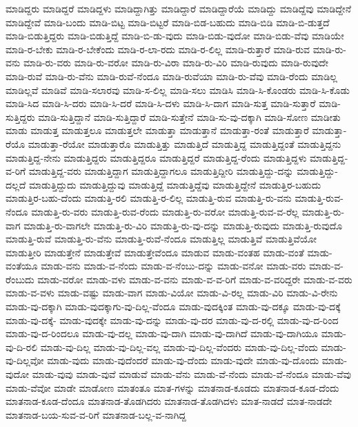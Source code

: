 {ಮಾಡಿದ್ದರು
ಮಾಡಿದ್ದರೆ
ಮಾಡಿದ್ದಳು
ಮಾಡಿದ್ದಾಗಿತ್ತು
ಮಾಡಿದ್ದಾರೆ
ಮಾಡಿದ್ದಾರೆಯೆ
ಮಾಡಿದ್ದು
ಮಾಡಿದ್ದೆವು
ಮಾಡಿದ್ದೇನೆ
ಮಾಡಿದ್ದೇವೆ
ಮಾಡಿ-ಬಂದು
ಮಾಡಿ-ಬಿಟ್ಟ
ಮಾಡಿ-ಬಿಟ್ಟರೆ
ಮಾಡಿ-ಬಿಡ-ಬಹುದು
ಮಾಡಿ-ಬಿಡಿ
ಮಾಡಿ-ಬಿ-ಡುತ್ತದೆ
ಮಾಡಿ-ಬಿಡುತ್ತಿದ್ದರು
ಮಾಡಿ-ಬಿಡುತ್ತಿದ್ದೆ
ಮಾಡಿ-ಬಿ-ಡು-ವುದು
ಮಾಡಿ-ಬಿಡು-ವುದೋ
ಮಾಡಿ-ಬಿಡು-ವೆವು
ಮಾಡಿಯೇ
ಮಾಡಿ-ರ-ಬೇಕು
ಮಾಡಿ-ರ-ಬೇಕೆಂದು
ಮಾಡಿ-ರ-ಲಾ-ರದು
ಮಾಡಿ-ರ-ಲಿಲ್ಲ
ಮಾಡಿ-ರುತ್ತಾರೆ
ಮಾಡಿ-ರುವ
ಮಾಡಿ-ರು-ವನು
ಮಾಡಿ-ರು-ವರು
ಮಾಡಿ-ರು-ವರೋ
ಮಾಡಿ-ರು-ವಿರಾ
ಮಾಡಿ-ರು-ವಿರಿ
ಮಾಡಿ-ರುವುದು
ಮಾಡಿ-ರುವುದೇ
ಮಾಡಿ-ರುವೆ
ಮಾಡಿ-ರು-ವೆನು
ಮಾಡಿ-ರುವೆ-ನೆಂದೂ
ಮಾಡಿ-ರುವೆಯಾ
ಮಾಡಿ-ರು-ವೆವು
ಮಾಡಿ-ರೆಂದು
ಮಾಡಿಲ್ಲ
ಮಾಡಿಲ್ಲವೆ
ಮಾಡಿವೆ
ಮಾಡಿ-ಸಲಾರವು
ಮಾಡಿ-ಸ-ಲಿಲ್ಲ
ಮಾಡಿ-ಸಲು
ಮಾಡಿಸಿ
ಮಾಡಿ-ಸಿ-ಕೊಂಡರು
ಮಾಡಿ-ಸಿ-ಕೊಡು
ಮಾಡಿ-ಸಿದ
ಮಾಡಿ-ಸಿ-ದರು
ಮಾಡಿ-ಸಿ-ದರೆ
ಮಾಡಿ-ಸಿ-ದಳು
ಮಾಡಿ-ಸಿ-ದಾಗ
ಮಾಡಿ-ಸುತ್ತ
ಮಾಡಿ-ಸುತ್ತಾರೆ
ಮಾಡಿ-ಸುತ್ತಿದ್ದರು
ಮಾಡಿ-ಸುತ್ತಿದ್ದಾನೆ
ಮಾಡಿ-ಸುತ್ತಿದ್ದಾರೆ
ಮಾಡಿ-ಸುತ್ತೇನೆ
ಮಾಡಿ-ಸು-ವು-ದಕ್ಕಾಗಿ
ಮಾಡಿ-ಸೋಣ
ಮಾಡೀತು
ಮಾಡು
ಮಾಡುತ್ತ
ಮಾಡುತ್ತಲೂ
ಮಾಡುತ್ತಲೇ
ಮಾಡುತ್ತಾ
ಮಾಡುತ್ತಾನೆ
ಮಾಡುತ್ತಾ-ರಂತೆ
ಮಾಡುತ್ತಾರೆ
ಮಾಡುತ್ತಾ-ರೆಯೊ
ಮಾಡುತ್ತಾ-ರೆಯೋ
ಮಾಡುತ್ತಾರೊ
ಮಾಡುತ್ತಿತ್ತು
ಮಾಡುತ್ತಿದೆ
ಮಾಡುತ್ತಿದ್ದ
ಮಾಡುತ್ತಿದ್ದಂತೆ
ಮಾಡುತ್ತಿದ್ದನು
ಮಾಡುತ್ತಿದ್ದ-ನೇನು
ಮಾಡುತ್ತಿದ್ದರು
ಮಾಡುತ್ತಿದ್ದರೂ
ಮಾಡುತ್ತಿದ್ದರೆ
ಮಾಡುತ್ತಿದ್ದ-ರೆಂದು
ಮಾಡುತ್ತಿದ್ದಳು
ಮಾಡುತ್ತಿದ್ದ-ವ-ರಿಗೆ
ಮಾಡುತ್ತಿದ್ದ-ವರು
ಮಾಡುತ್ತಿದ್ದಾಗ
ಮಾಡುತ್ತಿದ್ದಾಗಲೂ
ಮಾಡುತ್ತಿದ್ದೀರಿ
ಮಾಡುತ್ತಿದ್ದು-ದನ್ನು
ಮಾಡುತ್ತಿದ್ದು-ದಲ್ಲದೆ
ಮಾಡುತ್ತಿದ್ದುದು
ಮಾಡುತ್ತಿದ್ದುವು
ಮಾಡುತ್ತಿದ್ದೆ
ಮಾಡುತ್ತಿದ್ದೆವು
ಮಾಡುತ್ತಿದ್ದೇನೆ
ಮಾಡುತ್ತಿರ-ಬಹುದು
ಮಾಡುತ್ತಿರ-ಬಹು-ದೆಂದು
ಮಾಡುತ್ತಿ-ರಲಿ
ಮಾಡುತ್ತಿ-ರ-ಲಿಲ್ಲ
ಮಾಡುತ್ತಿ-ರುವ
ಮಾಡುತ್ತಿ-ರು-ವನು
ಮಾಡುತ್ತಿ-ರುವ-ನೆಂದೂ
ಮಾಡುತ್ತಿ-ರು-ವರು
ಮಾಡುತ್ತಿ-ರುವ-ರೆಂದು
ಮಾಡುತ್ತಿ-ರು-ವರೋ
ಮಾಡುತ್ತಿ-ರುವ-ವ-ರೆಲ್ಲ
ಮಾಡುತ್ತಿ-ರು-ವಾಗ
ಮಾಡುತ್ತಿ-ರು-ವಾಗಲೇ
ಮಾಡುತ್ತಿ-ರು-ವಿರಿ
ಮಾಡುತ್ತಿ-ರು-ವು-ದನ್ನು
ಮಾಡುತ್ತಿ-ರುವುದು
ಮಾಡುತ್ತಿ-ರುವುದೊ
ಮಾಡುತ್ತಿ-ರುವೆ
ಮಾಡುತ್ತಿ-ರು-ವೆನು
ಮಾಡುತ್ತಿ-ರುವೆ-ನೆಂದೂ
ಮಾಡುತ್ತಿಲ್ಲ
ಮಾಡುತ್ತಿವೆ
ಮಾಡುತ್ತಿವೆಯೋ
ಮಾಡುತ್ತೀರಿ
ಮಾಡುತ್ತೇನೆ
ಮಾಡುತ್ತೇವೆ
ಮಾಡುತ್ತೇವೆಂದೂ
ಮಾಡುವ
ಮಾಡು-ವಂತಹ
ಮಾಡು-ವಂತೆ
ಮಾಡು-ವಂತೆಯೂ
ಮಾಡು-ವನು
ಮಾಡು-ವ-ನೆಂದು
ಮಾಡು-ವ-ನೆಂಬು-ದನ್ನು
ಮಾಡು-ವನೋ
ಮಾಡು-ವರು
ಮಾಡು-ವ-ರೆಂಬುದು
ಮಾಡು-ವರೋ
ಮಾಡು-ವಳು
ಮಾಡು-ವ-ವನು
ಮಾಡು-ವ-ವ-ರಿಗೆ
ಮಾಡು-ವ-ವರಿದ್ದರೇ
ಮಾಡು-ವ-ವರು
ಮಾಡು-ವ-ವಳು
ಮಾಡು-ವಷ್ಟು
ಮಾಡು-ವಾಗ
ಮಾಡು-ವಿಯೋ
ಮಾಡು-ವಿ-ರಲ್ಲ
ಮಾಡು-ವಿರಿ
ಮಾಡು-ವಿ-ರೇನು
ಮಾಡು-ವು-ದಕ್ಕಾಗಿ
ಮಾಡು-ವುದಕ್ಕಾಗು-ವು-ದಿಲ್ಲ-ವೆಂದೂ
ಮಾಡು-ವುದಕ್ಕಿಂತ
ಮಾಡು-ವು-ದಕ್ಕೂ
ಮಾಡು-ವು-ದಕ್ಕೆ
ಮಾಡು-ವು-ದಕ್ಕೆ-
ಮಾಡು-ವುದಕ್ಕೇ
ಮಾಡು-ವು-ದನ್ನು
ಮಾಡು-ವು-ದರ
ಮಾಡು-ವು-ದ-ರಲ್ಲಿ
ಮಾಡು-ವು-ದ-ರಿಂದ
ಮಾಡು-ವು-ದ-ರಿಂದಲೂ
ಮಾಡು-ವು-ದಲ್ಲ
ಮಾಡು-ವು-ದಾಗಿ
ಮಾಡು-ವು-ದಾಗಿದೆ
ಮಾಡು-ವು-ದಾಗಿಯೂ
ಮಾಡು-ವು-ದಿ-ರಲಿ
ಮಾಡು-ವು-ದಿಲ್ಲ
ಮಾಡು-ವು-ದಿಲ್ಲ-ವಲ್ಲ
ಮಾಡು-ವು-ದಿಲ್ಲ-ವೆಂದರು
ಮಾಡು-ವು-ದಿಲ್ಲ-ವೆಂದು
ಮಾಡು-ವು-ದಿಲ್ಲವೋ
ಮಾಡು-ವುದು
ಮಾಡು-ವುದೆಂದರೆ
ಮಾಡು-ವು-ದೆಂದು
ಮಾಡು-ವುದೇ
ಮಾಡು-ವು-ದೊಂದು
ಮಾಡು-ವುದೋ
ಮಾಡು-ವುವು
ಮಾಡು-ವುವೆ
ಮಾಡುವೆ
ಮಾಡು-ವೆನು
ಮಾಡು-ವೆ-ನೆಂದು
ಮಾಡು-ವೆ-ನೆಂದೂ
ಮಾಡು-ವೆವು
ಮಾಡು-ವೆವೋ
ಮಾಡೇ
ಮಾಡೋಣ
ಮಾತಂತೂ
ಮಾತ-ಗಳನ್ನು
ಮಾತನಾಡ-ಕೂಡದು
ಮಾತನಾಡ-ಕೂಡ-ದೆಂದು
ಮಾತನಾಡ-ಕೂಡ-ದೆಂದೂ
ಮಾತನಾಡ-ತೊಡಗಿದರು
ಮಾತನಾಡ-ತೊಡಗಿದಳು
ಮಾತ-ನಾಡದೆ
ಮಾತ-ನಾಡದೇ
ಮಾತನಾಡ-ಬಯ-ಸುವ-ವ-ರಿಗೆ
ಮಾತನಾಡ-ಬಲ್ಲ-ವ-ನಾಗಿದ್ದ
}
